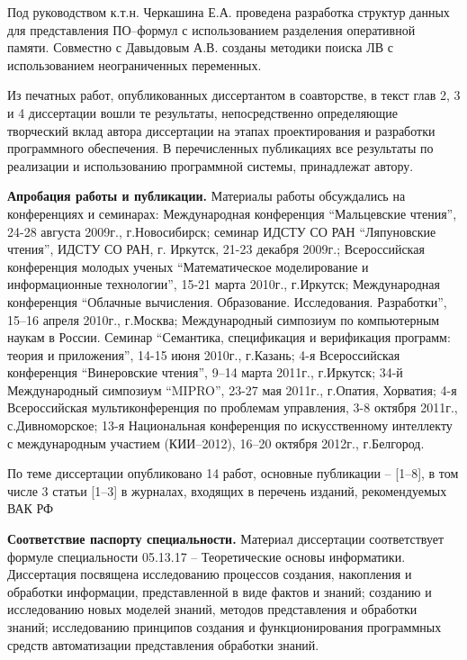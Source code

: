 \documentclass[a4paper]{report}
\begin{document}
Под руководством к.т.н. Черкашина Е.А. проведена разработка структур данных для представления ПО--формул с использованием разделения оперативной памяти. Совместно с Давыдовым А.В. созданы методики поиска ЛВ с использованием неограниченных переменных.

Из печатных работ, опубликованных диссертантом в соавторстве, в текст глав 2, 3 и 4 диссертации вошли те результаты, непосредственно определяющие творческий вклад автора диссертации на этапах проектирования и разработки программного обеспечения. В перечисленных публикациях все результаты по реализации и использованию программной системы, принадлежат автору.


\textbf{Апробация работы и публикации.}
Материалы работы обсуждались на конференциях и семинарах:
Международная конференция ``Мальцевские чтения'', 24-28 августа 2009г., г.Новосибирск;
семинар ИДСТУ СО РАН ``Ляпуновские чтения'', ИДСТУ СО РАН, г. Иркутск, 21-23 декабря 2009г.;
Всероссийская конференция молодых ученых ``Математическое моделирование и информационные технологии'', 15-21 марта 2010г., г.Иркутск;
Международная конференция ``Облачные вычисления. Образование. Исследования. Разработки'', 15--16 апреля 2010г., г.Москва;
Международный симпозиум по компьютерным наукам в России. Семинар ``Семантика, спецификация и верификация программ: теория и приложения'', 14-15 июня 2010г., г.Казань;
4-я Всероссийская конференция ``Винеровские чтения'', 9--14 марта 2011г., г.Иркутск;
34-й Международный симпозиум ``MIPRO'', 23-27 мая 2011г., г.Опатия, Хорватия;
4-я Всероссийская мультиконференция по проблемам управления,  3-8 октября 2011г., с.Дивноморское;
13-я Национальная конференция по искусственному интеллекту с международным участием (КИИ--2012), 16--20 октября 2012г., г.Белгород.

По теме диссертации опубликовано 14 работ, основные публикации -- [1--8], в том числе 3 статьи [1--3] в журналах, входящих в перечень изданий, рекомендуемых ВАК РФ


\textbf{Соответствие паспорту специальности.}
Материал диссертации соответствует формуле специальности 05.13.17 -- Теоретические основы информатики. Диссертация посвящена исследованию процессов создания, накопления и обработки информации, представленной в виде фактов и знаний; созданию и исследованию новых моделей знаний, методов представления и обработки знаний; исследованию принципов создания и функционирования программных средств автоматизации представления обработки знаний.
\end{document}
